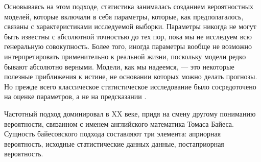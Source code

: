 Основываясь на этом подходе, статистика занималась созданием вероятностных моделей, которые включали в себя параметры, которые, как предполагалось, связаны с характеристиками исследуемой выборки. Параметры никогда не могут быть известны с абсолютной точностью до тех пор, пока мы не исследуем всю генеральную совокупность. Более того, иногда параметры вообще не возможно интерпретировать применительно к реальной жизни, поскольку модели редко бывают абсолютно верными. Модели, как мы надеемся, --- это некоторые полезные приближения к истине, не основании которых можно делать прогнозы. Но прежде всего классическое статистическое исследование было сосредоточено на оценке параметров, а не на предсказании \cite[стр. 1]{Gaul2012}.


Частотный подход доминировал в XX веке, придя на смену другому пониманию вероятности, связанном с именем английского математика Томаса Байеса\cite[стр. 2]{Efron2005}. Сущность байесовского подхода составляют три элемента: априорная вероятность, исходные статистические данных данные, постаприорная вероятность.

